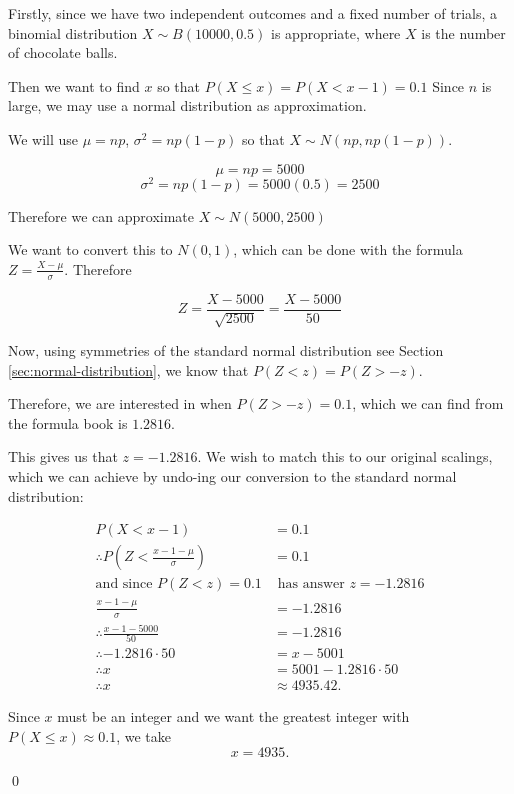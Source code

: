 \begin{solution}
    Firstly, since we have two independent outcomes and a fixed number of trials, a binomial distribution $X\sim B(10000,0.5)$ is appropriate, where $X$ is the number of chocolate balls.

    Then we want to find $x$ so that $P(X\leq x) = P(X<x-1) = 0.1$
    Since $n$ is large, we may use a normal distribution as approximation.

    We will use $\mu = np$, $\sigma^2 = np(1-p)$ so that $X \sim N(np,np(1-p))$.

    \[\mu = np = 5000\]
    \[\sigma^2 = np(1-p) = 5000(0.5) = 2500\]

    Therefore we can approximate $X \sim N(5000,2500)$

    We want to convert this to $N(0,1)$, which can be done with the formula $Z = \frac{X - \mu}{\sigma}$. Therefore 

    \[Z = \frac{X - 5000}{\sqrt{2500}} = \frac{X - 5000}{50}\]

    Now, using symmetries of the standard normal distribution see Section \ref{sec:normal-distribution}, we know that $P(Z<z) = P(Z>-z)$.

    Therefore, we are interested in when $P(Z>-z)=0.1$, which we can find from the formula book is $1.2816$.

    This gives us that $z = -1.2816$. We wish to match this to our original scalings, which we can achieve by undo-ing our conversion to the standard normal distribution:

    \begin{align*}
        P(X<x-1) &= 0.1 \\
        \therefore P(Z<\frac{x-1 - \mu}{\sigma}) &= 0.1 \\
        \text{and since }P(Z<z)=0.1 &\text{ has answer }z= -1.2816\\
        \frac{x-1 - \mu}{\sigma} &= -1.2816 \\
        \therefore \frac{x-1 - 5000}{50} &= -1.2816\\ 
        \therefore -1.2816\cdot50 &= x - 5001 \\
        \therefore x &= 5001 -1.2816\cdot50\\
        \therefore x &\approx 4935.42.
    \end{align*}

    Since $x$ must be an integer and we want the greatest integer with $P(X\le x)\approx 0.1$, we take
    \[
    x = 4935.
    \]

    \qed
\end{solution}

